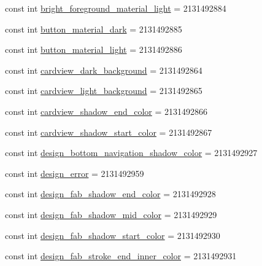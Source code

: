 \begin{CompactItemize}
\item 
const int \hyperlink{class__2doo_1_1_droid_1_1_resource_1_1_color_a89f15f1fb60371cbbde23d779f1d9b8}{bright\_\-foreground\_\-material\_\-light} = 2131492884
\item 
const int \hyperlink{class__2doo_1_1_droid_1_1_resource_1_1_color_c711984ffae9b168295b98630a3f7e6f}{button\_\-material\_\-dark} = 2131492885
\item 
const int \hyperlink{class__2doo_1_1_droid_1_1_resource_1_1_color_575be662eb2f6bd3b719bc290db89774}{button\_\-material\_\-light} = 2131492886
\item 
const int \hyperlink{class__2doo_1_1_droid_1_1_resource_1_1_color_13cf7475c04de9cbfb490956146f212a}{cardview\_\-dark\_\-background} = 2131492864
\item 
const int \hyperlink{class__2doo_1_1_droid_1_1_resource_1_1_color_f061dd612e47ae30cadca40873b65e6d}{cardview\_\-light\_\-background} = 2131492865
\item 
const int \hyperlink{class__2doo_1_1_droid_1_1_resource_1_1_color_b3653cc86a4a2baac0d219dd3ce7e4b8}{cardview\_\-shadow\_\-end\_\-color} = 2131492866
\item 
const int \hyperlink{class__2doo_1_1_droid_1_1_resource_1_1_color_52857db6b354c99477327cfca58d7ae2}{cardview\_\-shadow\_\-start\_\-color} = 2131492867
\item 
const int \hyperlink{class__2doo_1_1_droid_1_1_resource_1_1_color_0f514aa9b39a8341bc615f5be23a2d95}{design\_\-bottom\_\-navigation\_\-shadow\_\-color} = 2131492927
\item 
const int \hyperlink{class__2doo_1_1_droid_1_1_resource_1_1_color_e8393b20aadf0fd8d25c7ddd66730a27}{design\_\-error} = 2131492959
\item 
const int \hyperlink{class__2doo_1_1_droid_1_1_resource_1_1_color_920d67fb2673dabc0203605280f4c2a5}{design\_\-fab\_\-shadow\_\-end\_\-color} = 2131492928
\item 
const int \hyperlink{class__2doo_1_1_droid_1_1_resource_1_1_color_11971c25f77ff44377cce0210ee4cbb6}{design\_\-fab\_\-shadow\_\-mid\_\-color} = 2131492929
\item 
const int \hyperlink{class__2doo_1_1_droid_1_1_resource_1_1_color_4164eab43a07654e9301c4b4c640afbb}{design\_\-fab\_\-shadow\_\-start\_\-color} = 2131492930
\item 
const int \hyperlink{class__2doo_1_1_droid_1_1_resource_1_1_color_f307b1bf261ee93a8f22597d8299b971}{design\_\-fab\_\-stroke\_\-end\_\-inner\_\-color} = 2131492931
\item 

\end{CompactItemize}
